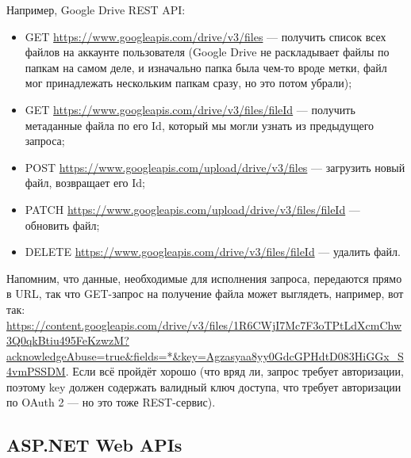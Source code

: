 \documentclass[a5paper]{article}
\begin{document}
Например, Google Drive REST API:

\begin{itemize}
    \item GET \url{https://www.googleapis.com/drive/v3/files} --- получить список всех файлов на аккаунте пользователя (Google Drive не раскладывает файлы по папкам на самом деле, и изначально папка была чем-то вроде метки, файл мог принадлежать нескольким папкам сразу, но это потом убрали);
    \item GET \url{https://www.googleapis.com/drive/v3/files/fileId} --- получить метаданные файла по его Id, который мы могли узнать из предыдущего запроса;
    \item POST \url{https://www.googleapis.com/upload/drive/v3/files} --- загрузить новый файл, возвращает его Id;
    \item PATCH \url{https://www.googleapis.com/upload/drive/v3/files/fileId} --- обновить файл;
    \item DELETE \url{https://www.googleapis.com/drive/v3/files/fileId} --- удалить файл.
\end{itemize}

Напомним, что данные, необходимые для исполнения запроса, передаются прямо в URL, так что GET-запрос на получение файла может выглядеть, например, вот так: \url{https://content.googleapis.com/drive/v3/files/1R6CWjI7Mc7F3oTPtLdXcmChw3Q0qkBtiu495FeKzwzM?acknowledgeAbuse=true&fields=*&key=Agzasyaa8yy0GdcGPHdtD083HiGGx_S4vmPSSDM}. Если всё пройдёт хорошо (что вряд ли, запрос требует авторизации, поэтому key должен содержать валидный ключ доступа, что требует авторизации по OAuth 2 --- но это тоже REST-сервис).

\subsection{ASP.NET Web APIs}
\end{document}
